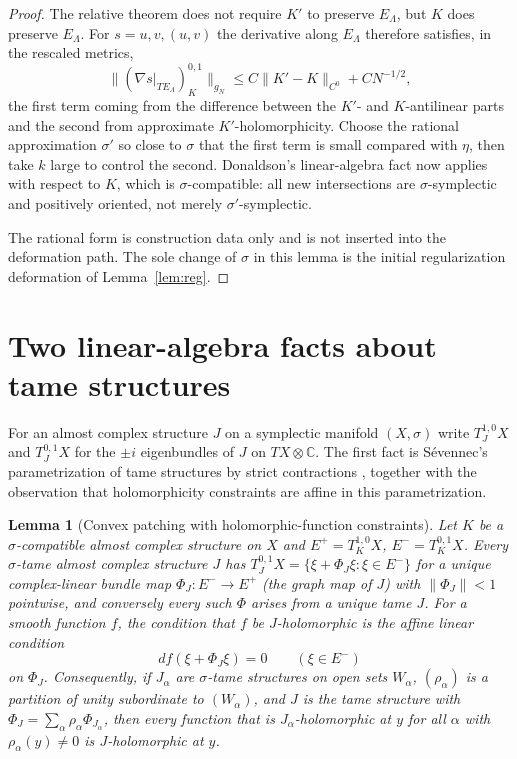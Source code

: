 \documentclass[12pt]{article}
\newtheorem{lemma}[theorem]{Lemma}
\theoremstyle{remark}
\newcommand{\C}{\mathbb C}
\begin{document}
\begin{proof}
The relative theorem does not require $K'$ to preserve $E_\Lambda$, but
$K$ does preserve $E_\Lambda$. For $s=u,v,(u,v)$ the derivative along
$E_\Lambda$ therefore satisfies, in the rescaled metrics,
\[
 \bigl\|(\nabla s|_{TE_\Lambda})^{0,1}_K\bigr\|_{g_N}
 \le C\lVert K'-K\rVert_{C^0}+CN^{-1/2},
\]
the first term coming from the difference between the $K'$- and
$K$-antilinear parts and the second from approximate
$K'$-holomorphicity. Choose the rational approximation $\sigma'$ so
close to $\sigma$ that the first term is small compared with $\eta$,
then take $k$ large to control the second. Donaldson's linear-algebra
fact now applies with respect to $K$, which is $\sigma$-compatible: all
new intersections are $\sigma$-symplectic and positively oriented, not
merely $\sigma'$-symplectic.

The rational form is construction data only and is not inserted into
the deformation path. The sole change of $\sigma$ in this lemma is the
initial regularization deformation of Lemma~\ref{lem:reg}.
\end{proof}

\section{Two linear-algebra facts about tame structures}\label{sec:linear}

For an almost complex structure $J$ on a symplectic manifold $(X,\sigma)$
write $T^{1,0}_JX$ and $T^{0,1}_JX$ for
the $\pm i$ eigenbundles of $J$ on $TX\otimes\C$. The first fact is
S\'evennec's parametrization of tame structures by strict contractions
\cite[Theorem 2.37]{Wendl}, together with the observation that
holomorphicity constraints are affine in this parametrization.

\begin{lemma}[Convex patching with holomorphic-function constraints]
\label{lem:convex}
Let $K$ be a $\sigma$-compatible almost complex structure on $X$ and
$E^+=T^{1,0}_KX$, $E^-=T^{0,1}_KX$. Every $\sigma$-tame almost complex
structure $J$ has $T^{0,1}_JX=\{\xi+\Phi_J\xi:\xi\in E^-\}$ for a unique
complex-linear bundle map $\Phi_J\colon E^-\to E^+$ (the \emph{graph
map} of $J$) with $\lVert\Phi_J\rVert<1$ pointwise, and conversely every
such $\Phi$ arises from a unique tame $J$. For a smooth function $f$,
the condition that $f$ be $J$-holomorphic is the affine linear condition
\begin{equation}\label{eq:affine}
 df(\xi+\Phi_J\xi)=0\qquad(\xi\in E^-)
\end{equation}
on $\Phi_J$. Consequently, if $J_\alpha$ are $\sigma$-tame structures on
open sets $W_\alpha$, $(\rho_\alpha)$ is a partition of unity
subordinate to $(W_\alpha)$, and $J$ is the tame structure with
$\Phi_J=\sum_\alpha\rho_\alpha\Phi_{J_\alpha}$, then every function that
is $J_\alpha$-holomorphic at $y$ for all $\alpha$ with $\rho_\alpha(y)\ne0$
is $J$-holomorphic at $y$.
\end{lemma}
\end{document}
